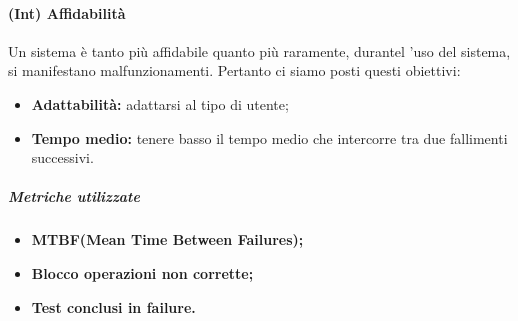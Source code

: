 \paragraph{\textbf{(Int) Affidabilità}}
	Un sistema è tanto più affidabile quanto più raramente, durantel 'uso del sistema, si manifestano malfunzionamenti. Pertanto ci siamo posti questi obiettivi:
	\begin{itemize}
	\item \textbf{Adattabilità:} adattarsi al tipo di utente;
	\item \textbf{Tempo medio:} tenere basso il tempo medio che intercorre tra due fallimenti successivi.
\end{itemize}
\vspace{0.8cm}
\subparagraph{Metriche utilizzate}
\begin{itemize}
	\item \textbf{MTBF(Mean Time Between Failures);}
	\item \textbf{Blocco operazioni non corrette;}
	\item \textbf{Test conclusi in failure.}
\end{itemize}
\begin{table}[!htpb]
	\centering
	\renewcommand{\arraystretch}{2} 
	\caption{TBD}
\end{table}
